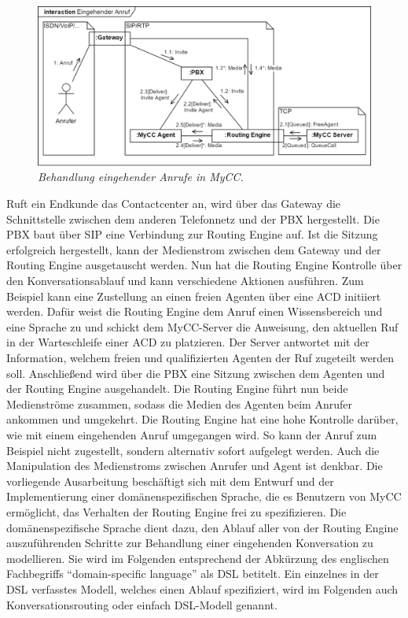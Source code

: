 \begin{figure} %
	\centering
		\includegraphics[width=\textwidth]{img/RoutingEngineSipExplanation.png}
	\caption[Behandlung eingehender Rufe in MyContactCenter]{\textit{Behandlung eingehender Anrufe in MyCC.}}
	\label{fig:InteractionIncomingCall}
\end{figure}
\noindent Ruft ein Endkunde das Contactcenter an, wird über das Gateway die Schnittstelle zwischen dem anderen Telefonnetz und der PBX hergestellt. Die PBX baut über SIP eine Verbindung zur Routing Engine auf. Ist die Sitzung erfolgreich hergestellt, kann der Medienstrom zwischen dem Gateway und der Routing Engine ausgetauscht werden. Nun hat die Routing Engine Kontrolle über den Konversationsablauf und kann verschiedene Aktionen ausführen. Zum Beispiel kann eine Zustellung an einen freien Agenten über eine ACD initiiert werden. Dafür weist die Routing Engine dem Anruf einen Wissensbereich und eine Sprache zu und schickt dem MyCC-Server die Anweisung, den aktuellen Ruf in der Warteschleife einer ACD zu platzieren. Der Server antwortet mit der Information, welchem freien und qualifizierten Agenten der Ruf zugeteilt werden soll. Anschließend wird über die PBX eine Sitzung zwischen dem Agenten und der Routing Engine ausgehandelt. Die Routing Engine führt nun beide Medienströme zusammen, sodass die Medien des Agenten beim Anrufer ankommen und umgekehrt. 
\newline
Die Routing Engine hat eine hohe Kontrolle darüber, wie mit einem eingehenden Anruf umgegangen wird. So kann der Anruf zum Beispiel nicht zugestellt, sondern alternativ sofort aufgelegt werden. Auch die Manipulation des Medienstroms zwischen Anrufer und Agent ist denkbar. Die vorliegende Ausarbeitung beschäftigt sich mit dem Entwurf und der Implementierung einer domänenspezifischen Sprache, die es Benutzern von MyCC ermöglicht, das Verhalten der Routing Engine frei zu spezifizieren. Die domänenspezifische Sprache dient dazu, den Ablauf aller von der Routing Engine auszuführenden Schritte zur Behandlung einer eingehenden Konversation zu modellieren. Sie wird im Folgenden entsprechend der Abkürzung des englischen Fachbegriffs ``domain-specific language'' als DSL betitelt. Ein einzelnes in der DSL verfasstes Modell, welches einen Ablauf spezifiziert, wird im Folgenden auch Konversationsrouting oder einfach DSL-Modell genannt.
 
